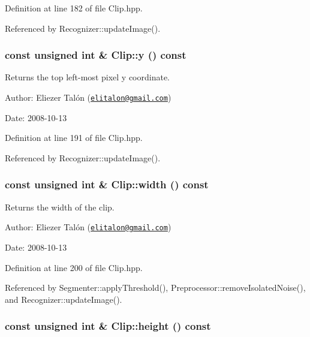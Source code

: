 Definition at line 182 of file Clip.hpp.

Referenced by Recognizer::updateImage().\hypertarget{class_clip_e06a2ad12ef2144a9d7d970b574c9c14}{
\subsubsection[y]{\setlength{\rightskip}{0pt plus 5cm}const unsigned int \& Clip::y () const}}
\label{class_clip_e06a2ad12ef2144a9d7d970b574c9c14}


Returns the top left-most pixel y coordinate. 

\begin{Desc}
\item[Author:]Eliezer Talón (\href{mailto:elitalon@gmail.com}{\tt elitalon@gmail.com}) \end{Desc}
\begin{Desc}
\item[Date:]2008-10-13 \end{Desc}


Definition at line 191 of file Clip.hpp.

Referenced by Recognizer::updateImage().\hypertarget{class_clip_88d1a47c0ec077e8c6680785509389b0}{
\subsubsection[width]{\setlength{\rightskip}{0pt plus 5cm}const unsigned int \& Clip::width () const}}
\label{class_clip_88d1a47c0ec077e8c6680785509389b0}


Returns the width of the clip. 

\begin{Desc}
\item[Author:]Eliezer Talón (\href{mailto:elitalon@gmail.com}{\tt elitalon@gmail.com}) \end{Desc}
\begin{Desc}
\item[Date:]2008-10-13 \end{Desc}


Definition at line 200 of file Clip.hpp.

Referenced by Segmenter::applyThreshold(), Preprocessor::removeIsolatedNoise(), and Recognizer::updateImage().\hypertarget{class_clip_939908a8dde602d25335792cc0fd5d97}{
\subsubsection[height]{\setlength{\rightskip}{0pt plus 5cm}const unsigned int \& Clip::height () const}}
\label{class_clip_939908a8dde602d25335792cc0fd5d97}



